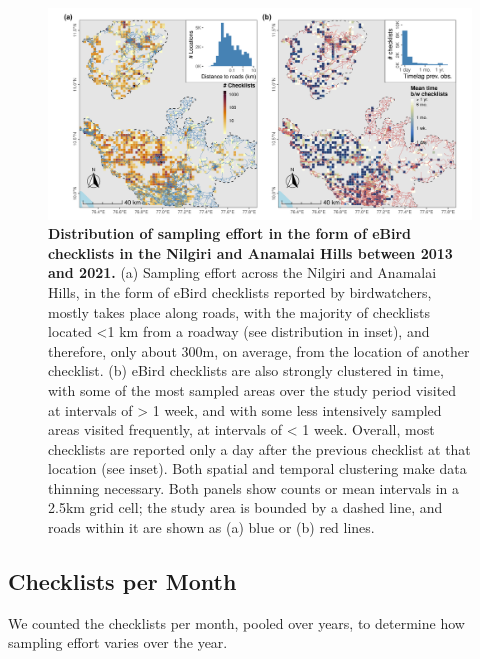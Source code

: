 \documentclass[
]{article}
\begin{document}
\begin{figure}
\centering
\includegraphics{figs/fig_03.png}
\caption{\textbf{Distribution of sampling effort in the form of eBird checklists in the Nilgiri and Anamalai Hills between 2013 and 2021.}
(a) Sampling effort across the Nilgiri and Anamalai Hills, in the form of eBird checklists reported by birdwatchers, mostly takes place along roads, with the majority of checklists located \textless1 km from a roadway (see distribution in inset), and therefore, only about 300m, on average, from the location of another checklist. (b) eBird checklists are also strongly clustered in time, with some of the most sampled areas over the study period visited at intervals of \textgreater{} 1 week, and with some less intensively sampled areas visited frequently, at intervals of \textless{} 1 week. Overall, most checklists are reported only a day after the previous checklist at that location (see inset). Both spatial and temporal clustering make data thinning necessary. Both panels show counts or mean intervals in a 2.5km grid cell; the study area is bounded by a dashed line, and roads within it are shown as (a) blue or (b) red lines.}
\end{figure}

\hypertarget{checklists-per-month}{%
\subsection{Checklists per Month}\label{checklists-per-month}}

We counted the checklists per month, pooled over years, to determine how sampling effort varies over the year.
\end{document}
